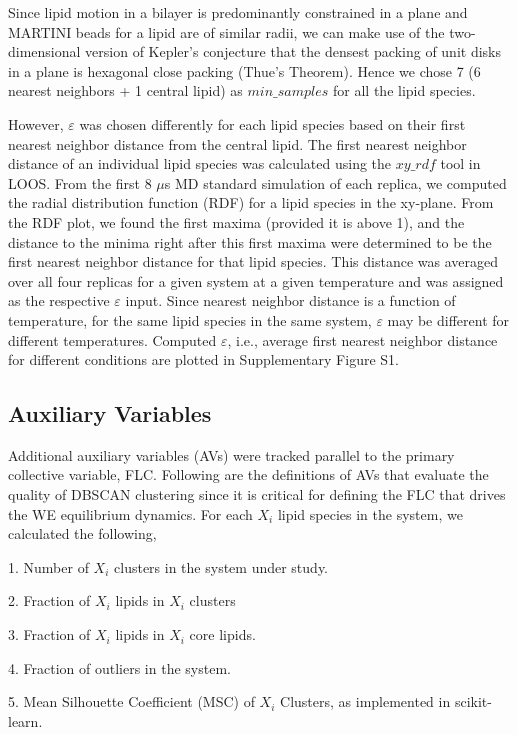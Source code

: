 \documentclass{biophys-new}
\begin{document}
Since lipid motion in a bilayer is predominantly constrained in a plane and MARTINI beads for a lipid are of similar radii, we can make use of the two-dimensional
version of Kepler's conjecture that the densest packing of unit disks in a plane is hexagonal close packing (Thue's Theorem).
Hence we chose 7 (6 nearest neighbors + 1 central lipid) as $min\_samples$ for all the lipid species.

However, $\varepsilon$ was chosen differently for each lipid species based on their first nearest neighbor distance from the central lipid.
The first nearest neighbor distance of an individual lipid species was calculated using the $xy\_rdf$ tool in LOOS.
From the first 8 $\mu$s MD standard simulation of each replica, we computed the radial distribution function (RDF) for a lipid species in the xy-plane. 
From the RDF plot, we found the first maxima (provided it is above 1), and the distance to the minima right after this first maxima were determined to be the first nearest neighbor distance for that lipid species.
This distance was averaged over all four replicas for a given system at a given temperature and was assigned as the respective $\varepsilon$ input.
Since nearest neighbor distance is a function of temperature, for the same lipid species in the same system, $\varepsilon$ may be different for different temperatures.
Computed $\varepsilon$, i.e., average first nearest neighbor distance for different conditions are plotted in Supplementary Figure S1.

\subsection*{Auxiliary Variables}

Additional auxiliary variables (AVs) were tracked parallel to the primary collective variable, FLC. 
Following are the definitions of AVs that evaluate the quality of DBSCAN clustering since it is critical for defining the FLC that drives the WE equilibrium dynamics. 
For each $X_i$ lipid species in the system, we calculated the following, 

1. Number of $X_i$ clusters in the system under study.

2. Fraction of $X_i$ lipids in $X_i$ clusters

3. Fraction of $X_i$ lipids in $X_i$ core lipids.

4. Fraction of outliers in the system.

5. Mean Silhouette Coefficient (MSC) of $X_i$ Clusters, as implemented in scikit-learn.
\end{document}
